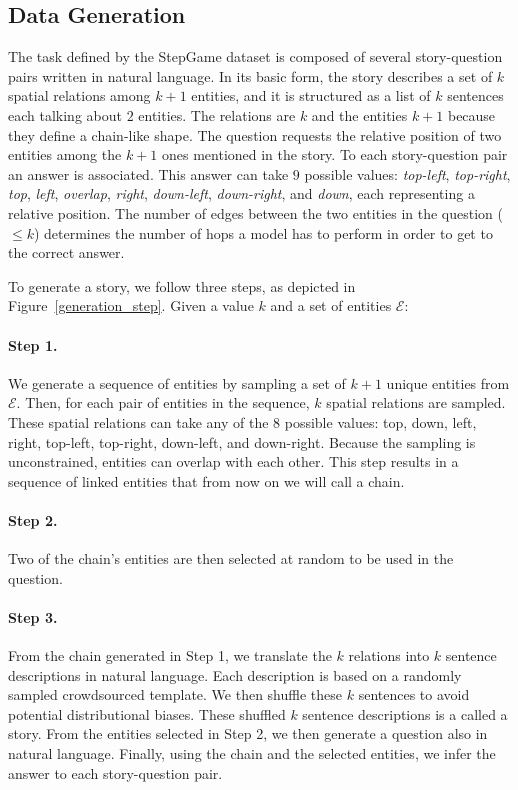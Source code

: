\documentclass[letterpaper]{article} \usepackage{aaai22}  \usepackage{times}  \usepackage{helvet}  \usepackage{courier}  \usepackage[hyphens]{url}  \usepackage{graphicx} \urlstyle{rm} \def\UrlFont{\rm}  \usepackage{natbib}  \usepackage{caption} \DeclareCaptionStyle{ruled}{labelfont=normalfont,labelsep=colon,strut=off} \frenchspacing  \setlength{\pdfpagewidth}{8.5in}  \setlength{\pdfpageheight}{11in}  \usepackage{algorithm}
\begin{document}
\subsection{Data Generation}
\label{data_generation}


The task defined by the StepGame dataset is composed of several story-question pairs written in natural language. In its basic form, the story describes a set of $k$ spatial relations among $k+1$ entities, and it is structured as a list of $k$ sentences each talking about $2$ entities. The relations are $k$ and the entities $k+1$ because they define a chain-like shape. The question requests the relative position of two entities among the $k+1$ ones mentioned in the story. To each story-question pair an answer is associated. This answer can take $9$ possible values: \textit{top-left}, \textit{top-right}, \textit{top}, \textit{left}, \textit{overlap}, \textit{right}, \textit{down-left}, \textit{down-right}, and \textit{down}, each representing a relative position.
The number of edges between the two entities in the question ($\leq k$) determines the number of hops a model has to perform in order to get to the correct answer.


To generate a story, we follow three steps, as depicted in Figure~\ref{generation_step}. Given a value $k$ and a set of entities $\mathcal{E}$:

\paragraph{Step 1.} We generate a sequence of entities by sampling a set of $k+1$ unique entities from $\mathcal{E}$. 
Then, for each pair of entities in the sequence, $k$ spatial relations are sampled. These spatial relations can take any of the 8 possible values: top, down, left, right, top-left, top-right, down-left, and down-right. 
Because the sampling is unconstrained, entities can overlap with each other.
This step results in a sequence of linked entities that from now on we will call a chain. 

\paragraph{Step 2.} Two of the chain's entities are then selected at random to be used in the question.

\paragraph{Step 3.} From the chain generated in Step 1, 
we translate the $k$ relations into $k$ sentence descriptions in natural language. Each description is based on a randomly sampled crowdsourced template. We then shuffle these $k$ sentences to avoid potential distributional biases. These shuffled $k$ sentence descriptions is a called a story. From the entities selected in Step 2, we then generate a question also in natural language. Finally, using the chain and the selected entities, we infer the answer to each story-question pair.
\end{document}
